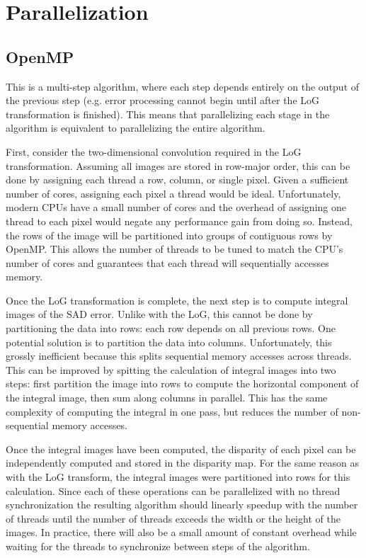 \documentclass{article}
\begin{document}
\section{Parallelization}
\label{sec:parallel}

\subsection{OpenMP}
\label{sec:parallel-omp}
This is a multi-step algorithm, where each step depends entirely on the output
of the previous step (e.g. error processing cannot begin until after the LoG
transformation is finished). This means that parallelizing each stage in the
algorithm is equivalent to parallelizing the entire algorithm.

First, consider the two-dimensional convolution required in the LoG
transformation. Assuming all images are stored in row-major order, this can be
done by assigning each thread a row, column, or single pixel. Given a
sufficient number of cores, assigning each pixel a thread would be ideal.
Unfortunately, modern CPUs have a small number of cores and the overhead of
assigning one thread to each pixel would negate any performance gain from doing
so. Instead, the rows of the image will be partitioned into groups of
contiguous rows by OpenMP. This allows the number of threads to be tuned to
match the CPU's number of cores and guarantees that each thread will
sequentially accesses memory.

Once the LoG transformation is complete, the next step is to compute integral
images of the SAD error. Unlike with the LoG, this cannot be done by
partitioning the data into rows: each row depends on all previous rows. One
potential solution is to partition the data into columns. Unfortunately, this
grossly inefficient because this splits sequential memory accesses across
threads. This can be improved by spitting the calculation of integral images
into two steps: first partition the image into rows to compute the horizontal
component of the integral image, then sum along columns in parallel. This has
the same complexity of computing the integral in one pass, but reduces the
number of non-sequential memory accesses.

Once the integral images have been computed, the disparity of each pixel can be
independently computed and stored in the disparity map. For the same reason as
with the LoG transform, the integral images were partitioned into rows for this
calculation. Since each of these operations can be parallelized with no thread
synchronization the resulting algorithm should linearly speedup with the number
of threads until the number of threads exceeds the width or the height of the
images. In practice, there will also be a small amount of constant overhead 
while waiting for the threads to synchronize between steps of the algorithm.
\end{document}
